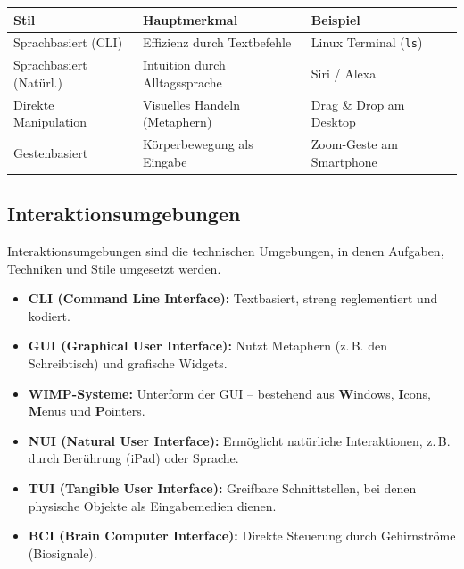 \documentclass[12pt, a4paper]{article}
\begin{document}
\vspace{0.5em}
\begin{center}
\begin{tabular}{p{3.5cm} p{5cm} p{4cm}}
\hline
\textbf{Stil} & \textbf{Hauptmerkmal} & \textbf{Beispiel} \\
\hline
Sprachbasiert (CLI)     & Effizienz durch Textbefehle       & Linux Terminal (\texttt{ls}) \\[3pt]
Sprachbasiert (Natürl.) & Intuition durch Alltagssprache    & Siri / Alexa \\[3pt]
Direkte Manipulation    & Visuelles Handeln (Metaphern)     & Drag \& Drop am Desktop \\[3pt]
Gestenbasiert           & Körperbewegung als Eingabe        & Zoom-Geste am Smartphone \\
\hline
\end{tabular}
\end{center}

\subsection{Interaktionsumgebungen}

Interaktionsumgebungen sind die technischen Umgebungen, in denen Aufgaben, Techniken
und Stile umgesetzt werden.

\begin{itemize}
  \item \textbf{CLI (Command Line Interface):} Textbasiert, streng reglementiert
        und kodiert.
  \item \textbf{GUI (Graphical User Interface):} Nutzt Metaphern (z.\,B. den
        \glqq{}Schreibtisch\grqq{}) und grafische Widgets.
  \item \textbf{WIMP-Systeme:} Unterform der GUI -- bestehend aus
        \textbf{W}indows, \textbf{I}cons, \textbf{M}enus und \textbf{P}ointers.
  \item \textbf{NUI (Natural User Interface):} Ermöglicht \glqq{}natürliche\grqq{} Interaktionen,
        z.\,B. durch Berührung (iPad) oder Sprache.
  \item \textbf{TUI (Tangible User Interface):} Greifbare Schnittstellen, bei denen
        physische Objekte als Eingabemedien dienen.
  \item \textbf{BCI (Brain Computer Interface):} Direkte Steuerung durch
        Gehirnströme (Biosignale).
\end{itemize}
\end{document}
